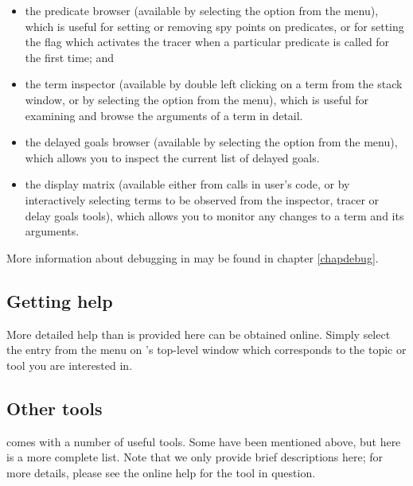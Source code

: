 \begin{itemize}

\item the predicate browser (available by selecting the  option from the  menu), which is useful for setting
or removing spy points on predicates, or for setting the
flag which activates the tracer when a particular predicate is called for
the first time; and

\item the term inspector (available by double left clicking on a term from
the stack window, or by selecting the 
option from the  menu), which is useful for examining and
browse the arguments of a term in detail.

\item the delayed goals browser (available by selecting the  option from the  menu), which allows you to inspect
the current list of delayed goals.

\item the display matrix (available either from calls in user's code, or by
interactively selecting terms to be observed from the inspector, tracer or
delay goals tools), which allows you to monitor any changes to a term and
its arguments.

\end{itemize}

More information about debugging in {\eclipse} may be found in chapter
\ref{chapdebug}.

\subsection{Getting help}

More detailed help than is provided here can be obtained online.
Simply select the entry from the  menu on {\tkeclipse}'s
top-level window which corresponds to the topic or tool you are interested
in.

\subsection{Other tools}

{\tkeclipse} comes with a number of useful tools.
Some have been mentioned above, but here is a more complete list.
Note that we only provide brief descriptions here; for more details, please
see the online help for the tool in question.

